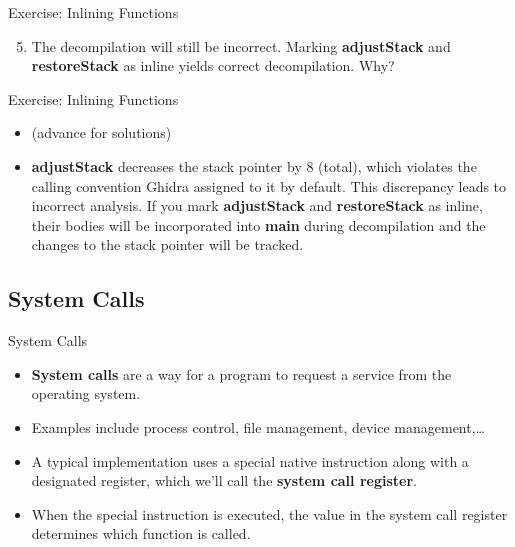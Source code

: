 \documentclass{beamer}
\begin{document}
\begin{frame}
\begin{block}{Exercise: Inlining Functions}
\begin{enumerate}
\setcounter{enumi}{4}
\item The decompilation will still be incorrect. Marking \textbf{adjustStack} and \textbf{restoreStack} as inline yields correct decompilation.  Why?
\end{enumerate}
\end{block}
\end{frame}

\begin{frame}
\begin{block}{Exercise: Inlining Functions}
\begin{itemize}
\item[] (advance for solutions)
\pause
\item \textbf{adjustStack} decreases the stack pointer by 8 (total), which violates the calling convention Ghidra assigned to it by default. This discrepancy leads to incorrect analysis. If you mark \textbf{adjustStack} and \textbf{restoreStack} as inline, their bodies will be incorporated into \textbf{main} during decompilation and the changes to the stack pointer will be tracked.
\end{itemize}
\end{block}
\end{frame}

\subsection{System Calls}
\begin{frame}
\begin{block}{System Calls}
\begin{itemize}
\item \textbf{System calls} are a way for a program to request a service from the operating system.
\item Examples include process control, file management, device management,\ldots
\item A typical implementation uses a special native instruction along with a designated register, which we'll call the
\textbf{system call register}.
\item When the special instruction is executed, the value in the system call register determines which function is called.
\end{itemize}
\end{block}
\end{frame}
\end{document}
